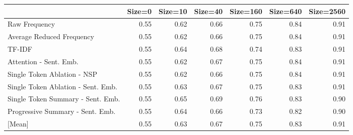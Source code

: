 \begin{tabular}{lrrrrrr}
\toprule
 & Size=0 & Size=10 & Size=40 & Size=160 & Size=640 & Size=2560 \\
\midrule
Raw Frequency & \cellcolor[RGB]{58,76,192}0.55 & \cellcolor[RGB]{120,155,247}0.62 & \cellcolor[RGB]{160,191,254}0.66 & \cellcolor[RGB]{234,211,199}0.75 & \cellcolor[RGB]{236,128,100}0.84 & \cellcolor[RGB]{179,3,38}0.91 \\
Average Reduced Frequency & \cellcolor[RGB]{58,76,192}0.55 & \cellcolor[RGB]{120,155,247}0.62 & \cellcolor[RGB]{160,191,254}0.66 & \cellcolor[RGB]{234,211,199}0.75 & \cellcolor[RGB]{236,128,100}0.84 & \cellcolor[RGB]{179,3,38}0.91 \\
TF-IDF & \cellcolor[RGB]{58,76,192}0.55 & \cellcolor[RGB]{139,174,253}0.64 & \cellcolor[RGB]{179,204,250}0.68 & \cellcolor[RGB]{228,216,209}0.74 & \cellcolor[RGB]{240,141,111}0.83 & \cellcolor[RGB]{179,3,38}0.91 \\
Attention - Sent. Emb. & \cellcolor[RGB]{58,76,192}0.55 & \cellcolor[RGB]{120,155,247}0.62 & \cellcolor[RGB]{170,198,253}0.67 & \cellcolor[RGB]{234,211,199}0.75 & \cellcolor[RGB]{236,128,100}0.84 & \cellcolor[RGB]{179,3,38}0.91 \\
Single Token Ablation - NSP & \cellcolor[RGB]{58,76,192}0.55 & \cellcolor[RGB]{120,155,247}0.62 & \cellcolor[RGB]{160,191,254}0.66 & \cellcolor[RGB]{234,211,199}0.75 & \cellcolor[RGB]{236,128,100}0.84 & \cellcolor[RGB]{179,3,38}0.91 \\
Single Token Ablation - Sent. Emb. & \cellcolor[RGB]{58,76,192}0.55 & \cellcolor[RGB]{130,165,251}0.63 & \cellcolor[RGB]{170,198,253}0.67 & \cellcolor[RGB]{234,211,199}0.75 & \cellcolor[RGB]{240,141,111}0.83 & \cellcolor[RGB]{179,3,38}0.91 \\
Single Token Summary - Sent. Emb. & \cellcolor[RGB]{58,76,192}0.55 & \cellcolor[RGB]{151,184,254}0.65 & \cellcolor[RGB]{188,209,246}0.69 & \cellcolor[RGB]{239,206,188}0.76 & \cellcolor[RGB]{240,141,111}0.83 & \cellcolor[RGB]{190,35,45}0.90 \\
Progressive Summary - Sent. Emb. & \cellcolor[RGB]{58,76,192}0.55 & \cellcolor[RGB]{139,174,253}0.64 & \cellcolor[RGB]{160,191,254}0.66 & \cellcolor[RGB]{220,220,221}0.73 & \cellcolor[RGB]{244,154,123}0.82 & \cellcolor[RGB]{190,35,45}0.90 \\
\midrule
{[Mean]} & \cellcolor[RGB]{58,76,192}0.55 & \cellcolor[RGB]{130,165,251}0.63 & \cellcolor[RGB]{168,197,253}0.67 & \cellcolor[RGB]{232,213,202}0.75 & \cellcolor[RGB]{239,137,108}0.83 & \cellcolor[RGB]{181,8,39}0.91 \\
\bottomrule
\end{tabular}